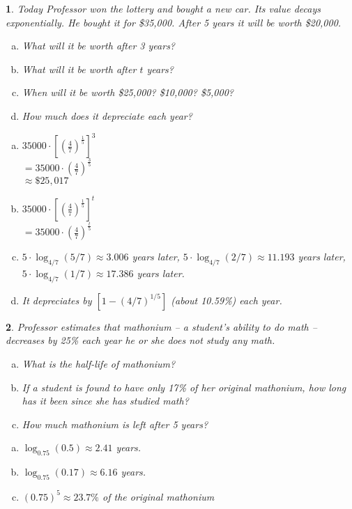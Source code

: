 \documentclass{amsbook}
\newcommand{\ssp}{\begin{enumerate}[(a), leftmargin=*]}
\newcommand{\esp}{\end{enumerate}}
\newtheorem{exc}{}
\newenvironment{ex}{\begin{exc}\normalfont}{\end{exc}}
\numberwithin{section}{chapter}
\numberwithin{equation}{chapter}
\begin{document}
\begin{ex}
	Today Professor won the lottery and bought a new car. Its value decays exponentially. He bought it for \$35,000. After 5 years it will be worth \$20,000.
	\ssp
	\item What will it be worth after 3 years?
	\item What will it be worth after $t$ years?
	\item When will it be worth \$25,000? \$10,000? \$5,000?
	\item How much does it depreciate each year?
	\esp
	\begin{sol}
	\ssp
		\item $35000\cdot \left[ \left( \frac{4}{7} \right)^{\frac{1}{5}} \right]^3$\\
		$= 35000\cdot \left( \frac{4}{7} \right)^{\frac{3}{5}}$\\
		$\approx \$25,017 $
		\item $35000\cdot \left[ \left( \frac{4}{7} \right)^{\frac{1}{5}} \right]^t$\\
		$= 35000\cdot \left( \frac{4}{7} \right)^{\frac{t}{5}}$
		\item $5\cdot\log_{4/7}(5/7) \approx 3.006$ years later, $5\cdot\log_{4/7}(2/7) \approx 11.193$ years later, $5\cdot\log_{4/7}(1/7) \approx 17.386$ years later.  
		\item It depreciates by $\left[ 1-(4/7)^{1/5} \right]$ (about 10.59\%) each year.
	\esp		
	\end{sol}
\end{ex}

\begin{ex} \label{mathonium}
	Professor estimates that mathonium -- a student's ability to do math -- decreases by 25\% each year he or she does not study any math.
	\ssp
	\item What is the half-life of mathonium?
	\item \label{SusieMathonium}If a student is found to have only 17\% of her original mathonium, how long has it been since she has studied math?
	\item How much mathonium is left after 5 years?
	\esp
	\begin{sol}
		\ssp
	\item $\log_{0.75}(0.5) \approx 2.41$ years.
	\item $\log_{0.75}(0.17) \approx 6.16$ years.
		\item $(0.75)^5 \approx 23.7\%$ of the original mathonium
	\esp
	\end{sol}
\end{ex}
\end{document}

